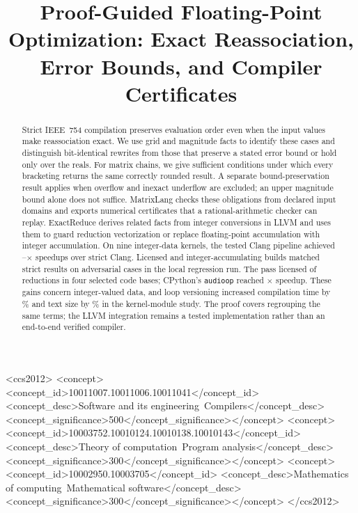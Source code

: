 \documentclass[acmsmall,review,anonymous,nonacm]{acmart}
\title[Proof-Guided Floating-Point Optimization]{Proof-Guided Floating-Point Optimization: Exact Reassociation, Error Bounds, and Compiler Certificates}
\author{\NoCaseChange{A Aswanth Raj}}
\affiliation{\institution{School of Computer Science and Engineering, VIT Vellore}\city{Vellore}\country{India}}
\author{\NoCaseChange{Dr. Ranjithkumar S}}
\affiliation{\institution{School of Computer Science and Engineering, VIT Vellore}\city{Vellore}\country{India}}
\begin{document}
\begin{abstract}
Strict IEEE~754 compilation preserves evaluation order even when the
input values make reassociation exact. We use grid and magnitude facts to
identify these cases and distinguish bit-identical rewrites from those that
preserve a stated error bound or hold only over the reals. For matrix chains,
we give sufficient conditions under which every bracketing returns the same
correctly rounded result. A separate bound-preservation result applies when
overflow and inexact underflow are excluded; an upper magnitude bound alone
does not suffice. MatrixLang checks these obligations from declared input
domains and exports numerical certificates that a rational-arithmetic checker
can replay. ExactReduce derives related facts from integer conversions in
LLVM and uses them to guard reduction vectorization or replace floating-point
accumulation with integer accumulation. On nine integer-data kernels,
the tested Clang pipeline achieved
\LlvmBenchLicensedLo--\LlvmBenchLicensedHi$\times$ speedups over strict
Clang. Licensed and integer-accumulating builds matched strict results on
\LlvmStressCases{} adversarial cases in the local regression run.
The pass licensed \LlvmScanVersioned{} of \LlvmScanReductions{} reductions
in four selected code bases; CPython's \texttt{audioop} reached
\LlvmAudioopAvgEight$\times$ speedup. These gains concern integer-valued
data, and loop versioning increased compilation time by
\LlvmCompileOverheadPct\% and text size by \LlvmCompileTextGrowthPct\%
in the kernel-module study. The proof covers regrouping the same terms;
the LLVM integration remains a tested implementation rather than an
end-to-end verified compiler.
\end{abstract}

\begin{CCSXML}
<ccs2012>
<concept><concept_id>10011007.10011006.10011041</concept_id>
<concept_desc>Software and its engineering~Compilers</concept_desc>
<concept_significance>500</concept_significance></concept>
<concept><concept_id>10003752.10010124.10010138.10010143</concept_id>
<concept_desc>Theory of computation~Program analysis</concept_desc>
<concept_significance>300</concept_significance></concept>
<concept><concept_id>10002950.10003705</concept_id>
<concept_desc>Mathematics of computing~Mathematical software</concept_desc>
<concept_significance>300</concept_significance></concept>
</ccs2012>
\end{CCSXML}
\end{document}
